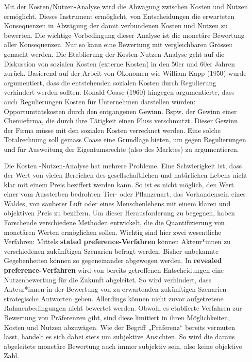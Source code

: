 \documentclass[
  nswissgerman,
  a4paper,
  DIV=11,
  numbers=noendperiod,
  oneside,
  openany]{scrreprt}
\begin{document}
\begin{tcolorbox}[enhanced jigsaw, arc=.35mm, bottomrule=.15mm, bottomtitle=1mm, breakable, colback=white, colbacktitle=quarto-callout-tip-color!10!white, colframe=quarto-callout-tip-color-frame, coltitle=black, left=2mm, leftrule=.75mm, opacityback=0, opacitybacktitle=0.6, rightrule=.15mm, title={Exkurs -- Kosten-Nutzen-Analyse}, titlerule=0mm, toprule=.15mm, toptitle=1mm]

Mit der Kosten/Nutzen-Analyse wird die Abwägung zwischen Kosten und
Nutzen ermöglicht. Dieses Instrument ermöglicht, von Entscheidungen die
erwarteten Konsequenzen in Abwägung der damit verbundenen Kosten und
Nutzen zu bewerten. Die wichtige Vorbedingung dieser Analyse ist die
monetäre Bewertung aller Konsequenzen. Nur so kann eine Bewertung mit
vergleichbaren Grössen gemacht werden. Die Etablierung der
Kosten-Nutzen-Analyse geht auf die Diskussion von sozialen Kosten
(externe Kosten) in den 50er und 60er Jahren zurück. Basierend auf der
Arbeit von Ökonomen wie William Kapp (1950) wurde argumentiert, dass die
entstehenden sozialen Kosten durch Regulierung verhindert werden
sollten. Ronald Coase (1960) hingegen argumentierte, dass auch
Regulierungen Kosten für Unternehmen darstellen würden:
Opportunitätskosten durch den entgangenen Gewinn. Bspw. der Gewinn einer
Chemiefirma, die durch ihre Tätigkeit einen Fluss verschmutzt. Dieser
Gewinn der Firma müsse mit den sozialen Kosten verrechnet werden. Eine
solche Totalrechnung soll gemäss Coase eine Grundlage bieten, um gegen
Regulierungen und für Ausweitung der Eigentumsrechte (also des Marktes)
zu argumentieren.

Die Kosten -Nutzen-Analyse hat mehrere Probleme. Eine Schwierigkeit ist,
dass der Wert von vielen Bereichen des gesellschaftlichen und
natürlichen Lebens nicht klar mit einem Preis beziffert werden kann. So
ist es nicht möglich, den Wert einer vom Aussterben bedrohten Tier- oder
Pflanzenart, das Vorhandensein eines Waldes, von sauberer Luft oder
eines Menschenlebens mit einem klaren und objektiven Preis zu beziffern.
Um dieser Herausforderung zu begegnen, haben Forschende verschiedene
Methoden entwickelt, die die Quantifizierung von monetären Werten
ermöglichen sollen. Wichtig sind hier zwei wesentliche Verfahren:
Mittels \textbf{stated preference-Verfahren} können Akteur*innen zu
verschiedenen zukünftigen Szenarien befragt werden. Bisher unbekannte
Gegebenheiten können so gegeneinander abgewogen werden. In
\textbf{revealed preference-Verfahren} wird von bereits getroffenen
Entscheidungen eine Nutzenbewertung für die Zukunft abgeleitet. So wird
verhindert, dass Akteur*innen in der Bewertung von zu erwartenden
zukünftigen Szenarien strategische Antworten geben. Allerdings können
nicht zuvor aufgetretene Rahmenbedingungen nicht bewertet werden. Obwohl
es etablierte Verfahren zur Bewertung von Präferenzen gibt, sind diese
limitiert in ihren Möglichkeiten, Kosten und Nutzen abzuwägen. Wie der
Begriff „Präferenz`` bereits vermuten lässt, handelt es sich dabei stets
um subjektive Ansichten. So wird die daraus abgeleitete monetäre
Bewertung auch immer subjektiv sein, also keine objektive Zahl.


\end{tcolorbox}
\end{document}
